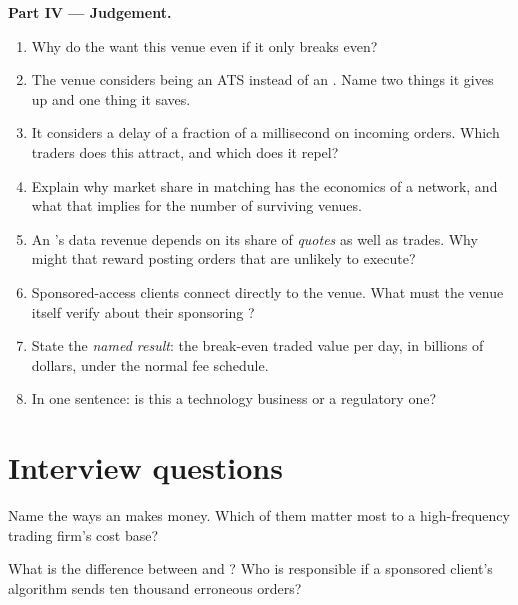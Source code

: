 \begin{problem}
\medskip\noindent\textbf{Part IV --- Judgement.}
\begin{enumerate}[resume]
\item Why do the  want this venue even if it only breaks even?
\item The venue considers being an ATS instead of an . Name two
things it gives up and one thing it saves.
\item It considers a delay of a fraction of a millisecond on incoming orders.
Which traders does this attract, and which does it repel?
\item Explain why market share in matching has the economics of a network,
and what that implies for the number of surviving venues.
\item An 's data revenue depends on its share of \emph{quotes} as
well as trades. Why might that reward posting orders that are unlikely to
execute?
\item Sponsored-access clients connect directly to the venue. What must the
venue itself verify about their sponsoring ?
\item State the \emph{named result}: the break-even traded value per day, in
billions of dollars, under the normal fee schedule.
\item In one sentence: is this a technology business or a regulatory one?
\end{enumerate}
\end{problem}

\section{Interview questions}

\begin{interviewq}\label{iq:m1:exchanges-brokers-venues:1}
Name the ways an  makes money. Which of them matter most to a
high-frequency trading firm's cost base?
\end{interviewq}

\begin{interviewq}\label{iq:m1:exchanges-brokers-venues:2}
What is the difference between  and ?
Who is responsible if a sponsored client's algorithm sends ten thousand
erroneous orders?
\end{interviewq}

